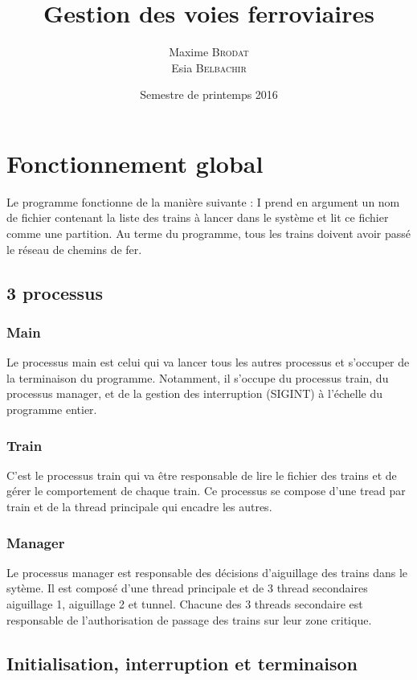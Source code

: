 \documentclass[a4paper,12pt]{article}
\title{Gestion des voies ferroviaires}{Projet de LO41}
\author{Maxime \textsc{Brodat} \\ Esia \textsc{Belbachir}}
\date{Semestre de printemps 2016}
\begin{document}
\maketitlepage

\tableofcontents
\pagebreak

\neverindent

\section{Fonctionnement global}

Le programme fonctionne de la manière suivante : I prend en argument un nom de fichier contenant la liste des trains à lancer dans le système et lit ce fichier comme une partition. Au terme du programme, tous les trains doivent avoir passé le réseau de chemins de fer.

\subsection{3 processus}

\subsubsection{Main}

Le processus main est celui qui va lancer tous les autres processus et s'occuper de la terminaison du programme. Notamment, il s'occupe du processus train, du processus manager, et de la gestion des interruption (SIGINT) à l'échelle du programme entier.

\subsubsection{Train}

C'est le processus train qui va être responsable de lire le fichier des trains et de gérer le comportement de chaque train. Ce processus se compose d'une tread par train et de la thread principale qui encadre les autres.

\subsubsection{Manager}

Le processus manager est responsable des décisions d'aiguillage des trains dans le sytème. Il est composé d'une thread principale et de 3 thread secondaires aiguillage 1, aiguillage 2 et tunnel. Chacune des 3 threads secondaire est responsable de l'authorisation de passage des trains sur leur zone critique.

\subsection{Initialisation, interruption et terminaison}
\end{document}
